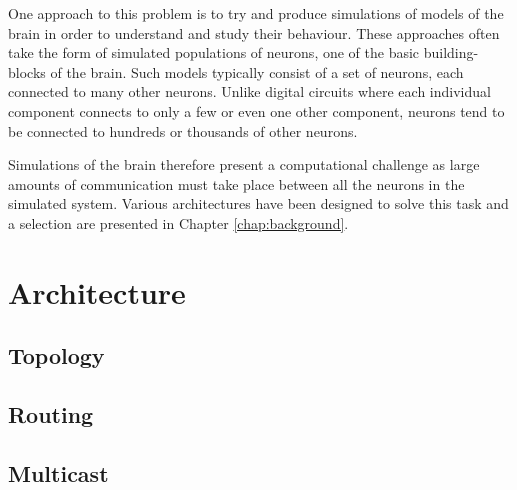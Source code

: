 			One approach to this problem is to try and produce simulations of models
			of the brain in order to understand and study their behaviour. These
			approaches often take the form of simulated populations of neurons, one
			of the basic building-blocks of the brain. Such models typically consist
			of a set of neurons, each connected to many other neurons.  Unlike
			digital circuits where each individual component connects to only a few
			or even one other component, neurons tend to be connected to hundreds or
			thousands of other neurons.
			
			Simulations of the brain therefore present a computational challenge as
			large amounts of communication must take place between all the neurons
			in the simulated system. Various architectures have been designed to
			solve this task and a selection are presented in Chapter
			\ref{chap:background}.
	
	\section{Architecture}
		
		\subsection{Topology}
		
		\subsection{Routing}
		
		\subsection{Multicast}

